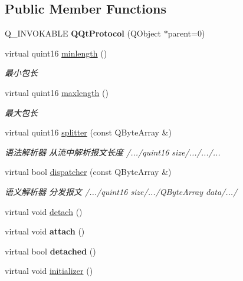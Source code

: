 \subsection*{Public Member Functions}
\begin{DoxyCompactItemize}
\item 
\mbox{\label{class_q_qt_protocol_a9e4b2132fb2b1c6a37964696e25cecf5}} 
Q\+\_\+\+I\+N\+V\+O\+K\+A\+B\+LE {\bfseries Q\+Qt\+Protocol} (Q\+Object $\ast$parent=0)
\item 
virtual quint16 \mbox{\hyperlink{class_q_qt_protocol_a2b00f53d3dd0eed817eeecff422891f3}{minlength}} ()
\begin{DoxyCompactList}\small\item\em 最小包长 \end{DoxyCompactList}\item 
virtual quint16 \mbox{\hyperlink{class_q_qt_protocol_af41bc3116abbbcfc9af45e151a253ff7}{maxlength}} ()
\begin{DoxyCompactList}\small\item\em 最大包长 \end{DoxyCompactList}\item 
virtual quint16 \mbox{\hyperlink{class_q_qt_protocol_a00fd0c1ac23379ed3b9b25da9a34f39b}{splitter}} (const Q\+Byte\+Array \&)
\begin{DoxyCompactList}\small\item\em 语法解析器 从流中解析报文长度 /.../quint16 size/.../.../... \end{DoxyCompactList}\item 
virtual bool \mbox{\hyperlink{class_q_qt_protocol_a35a69c4b89c8cf7459038f40d75e0dc9}{dispatcher}} (const Q\+Byte\+Array \&)
\begin{DoxyCompactList}\small\item\em 语义解析器 分发报文 /.../quint16 size/.../\+Q\+Byte\+Array data/.../ \end{DoxyCompactList}\item 
virtual void \mbox{\hyperlink{class_q_qt_protocol_a80b4de63c9a5bab33c22b7c47bd22c00}{detach}} ()
\item 
\mbox{\label{class_q_qt_protocol_a6531140a493fb35d4efd815dc9f89ce8}} 
virtual void {\bfseries attach} ()
\item 
\mbox{\label{class_q_qt_protocol_a7da29cf18ebb2b8924eab0bc73c46b57}} 
virtual bool {\bfseries detached} ()
\item 
virtual void \mbox{\hyperlink{class_q_qt_protocol_ad4caa7aadbb04320acc7d653956f51cb}{initializer}} ()
\end{DoxyCompactItemize}
